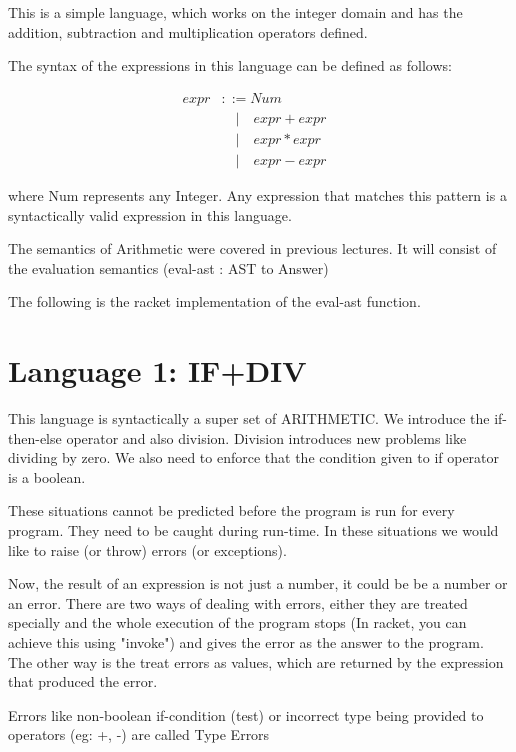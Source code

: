    This is a simple language, which works on the integer domain and has the addition, subtraction and multiplication operators defined.
    
    The syntax of the expressions in this language can be defined as follows:
    
    
    \begin{align}
    expr & ::= Num&\\
         & \quad |\quad expr + expr&\\
         & \quad |\quad expr * expr&\\
         & \quad |\quad expr - expr
    \end{align}
    
    where Num represents any Integer.
    Any expression that matches this pattern is a syntactically valid expression in this language.
    
    The semantics of Arithmetic were covered in previous lectures.
    It will consist of the evaluation semantics (eval-ast : AST to Answer)

    The following is the racket implementation of the eval-ast function.
    

    \section{Language 1: IF+DIV}

    This language is syntactically a super set of ARITHMETIC. We introduce the if-then-else operator and also division. Division introduces new problems like dividing by zero. We also need to enforce that the condition given to if operator is a boolean.

    These situations cannot be predicted before the program is run for every program. They need to be caught during run-time. In these situations we would like to raise (or throw) errors (or exceptions).

    Now, the result of an expression is not just a number, it could be be a number or an error. There are two ways of dealing with errors, either they are treated specially and the whole execution of the program stops (In racket, you can achieve this using "invoke") and gives the error as the answer to the program. The other way is the treat errors as values, which are returned by the expression that produced the error.

    Errors like non-boolean if-condition (test) or incorrect type being provided to operators (eg: +, -) are called Type Errors
    
